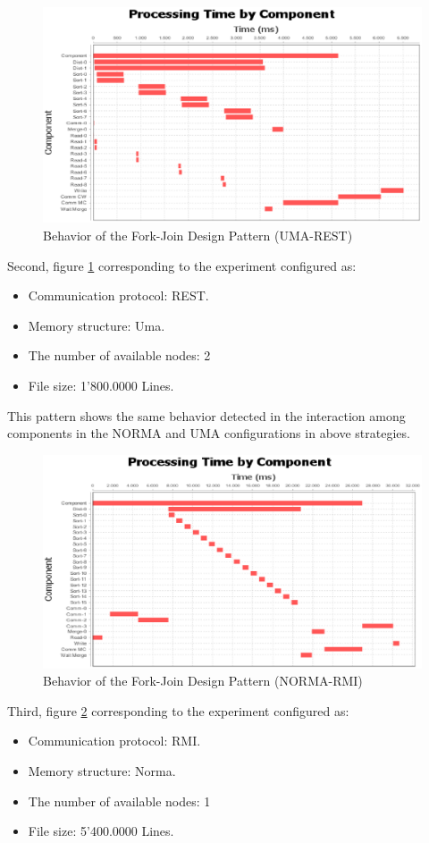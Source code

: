 \begin{figure}[H]
	\centering
	\includegraphics[trim=0.5cm 17cm -5cm 1cm, scale=0.9]{fig/FJDUmaRest218Behavior.eps}
	\caption{Behavior of the Fork-Join Design Pattern (UMA-REST)}
	\label{fig:forkJoinBehaviorRest}
\end{figure}
Second, figure \ref{fig:forkJoinBehaviorRest} corresponding to the experiment configured as: 
\begin{itemize}
	\item Communication protocol: REST.
	\item  Memory structure: Uma.
	\item The number of available nodes: 2
	\item File size: 1'800.0000 Lines.
\end{itemize}

This pattern shows the same behavior detected in the interaction among components in the NORMA and UMA configurations in above strategies.

\begin{figure}[H]
	\centering
	\includegraphics[trim=0.5cm 17cm -5cm 1cm, scale=0.9]{fig/FJDNormaRmi154Behavior.eps}
	\caption{Behavior of the Fork-Join Design Pattern (NORMA-RMI)}
	\label{fig:forkJoinBehaviorRmi}
\end{figure}
Third, figure \ref{fig:forkJoinBehaviorRmi} corresponding to the experiment configured as: 
\begin{itemize}
	\item Communication protocol: RMI.
	\item  Memory structure: Norma.
	\item The number of available nodes: 1
	\item File size: 5'400.0000 Lines.
\end{itemize}

